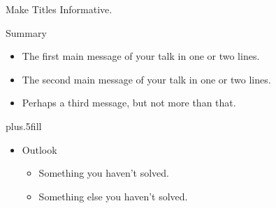 \documentclass[ucs,9pt]{beamer}
\begin{document}
\begin{frame}{Make Titles Informative.}
\end{frame}



\begin{frame}{Summary}

  \begin{itemize}
  \item
    The \alert{first main message} of your talk in one or two lines.
  \item
    The \alert{second main message} of your talk in one or two lines.
  \item
    Perhaps a \alert{third message}, but not more than that.
  \end{itemize}
  
  \vskip0pt plus.5fill
  \begin{itemize}
  \item
    Outlook
    \begin{itemize}
    \item
      Something you haven't solved.
    \item
      Something else you haven't solved.
    \end{itemize}
  \end{itemize}
\end{frame}
\end{document}

